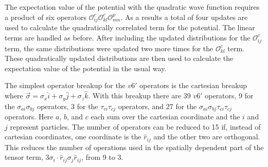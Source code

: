 \documentclass[aps,prc,twocolumn,superscriptaddress,floatfix]{revtex4-1}
\begin{document}
The expectation value of the potential with the quadratic wave function requires a product of six operators $\mathcal{O}^c_{ij}\mathcal{O}^c_{kl}\mathcal{O}^p_{mn}$. As a results a total of four updates are used to calculate the quadratically correlated term for the potential. The linear terms are handled as before. After including the updated distributions for the $\mathcal{O}^c_{ij}$ term, the same distributions were updated two more times for the $\mathcal{O}^c_{kl}$ term. These quadratically updated distributions are then used to calculate the expectation value of the potential in the usual way. %

The simplest operator breakup for the $v6'$ operators is the cartesian breakup where $\vec{\sigma} = \sigma_x\hat{i} + \sigma_y\hat{j} + \sigma_z\hat{k}$. With this breakup there are 39 $v6'$ operators, 9 for the $\sigma_{ai}\sigma_{bj}$ operators, 3 for the $\tau_{ci}\tau_{cj}$ operators, and 27 for the $\sigma_{ai}\sigma_{bj}\tau_{ci}\tau_{cj}$ operators. Here $a$, $b$, and $c$ each sum over the cartesian coordinate and the $i$ and $j$ represent particles. The number of operators can be reduced to 15 if, instead of cartesian coordinates, one coordinate is the $\hat{r}_{ij}$ and the other two are orthogonal. This reduces the number of operations used in the spatially dependent part of the tensor term, $3\sigma_i\cdot\hat{r}_{ij}\sigma_j\hat{r}_{ij}$, from 9 to 3.



\end{document}
